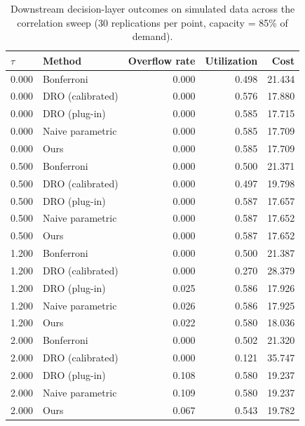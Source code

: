 \begin{table}[htbp]
\centering
\caption{Downstream decision-layer outcomes on simulated data across the correlation sweep (30 replications per point, capacity = 85\% of demand).}
\label{tab:decision-simulation}
\begin{tabular}{llrrr}
\toprule
$\tau$ & Method & Overflow rate & Utilization & Cost \\
\midrule
0.000 & Bonferroni & 0.000 & 0.498 & 21.434 \\
0.000 & DRO (calibrated) & 0.000 & 0.576 & 17.880 \\
0.000 & DRO (plug-in) & 0.000 & 0.585 & 17.715 \\
0.000 & Naive parametric & 0.000 & 0.585 & 17.709 \\
0.000 & Ours & 0.000 & 0.585 & 17.709 \\
0.500 & Bonferroni & 0.000 & 0.500 & 21.371 \\
0.500 & DRO (calibrated) & 0.000 & 0.497 & 19.798 \\
0.500 & DRO (plug-in) & 0.000 & 0.587 & 17.657 \\
0.500 & Naive parametric & 0.000 & 0.587 & 17.652 \\
0.500 & Ours & 0.000 & 0.587 & 17.652 \\
1.200 & Bonferroni & 0.000 & 0.500 & 21.387 \\
1.200 & DRO (calibrated) & 0.000 & 0.270 & 28.379 \\
1.200 & DRO (plug-in) & 0.025 & 0.586 & 17.926 \\
1.200 & Naive parametric & 0.026 & 0.586 & 17.925 \\
1.200 & Ours & 0.022 & 0.580 & 18.036 \\
2.000 & Bonferroni & 0.000 & 0.502 & 21.320 \\
2.000 & DRO (calibrated) & 0.000 & 0.121 & 35.747 \\
2.000 & DRO (plug-in) & 0.108 & 0.580 & 19.237 \\
2.000 & Naive parametric & 0.109 & 0.580 & 19.237 \\
2.000 & Ours & 0.067 & 0.543 & 19.782 \\
\bottomrule
\end{tabular}
\end{table}
